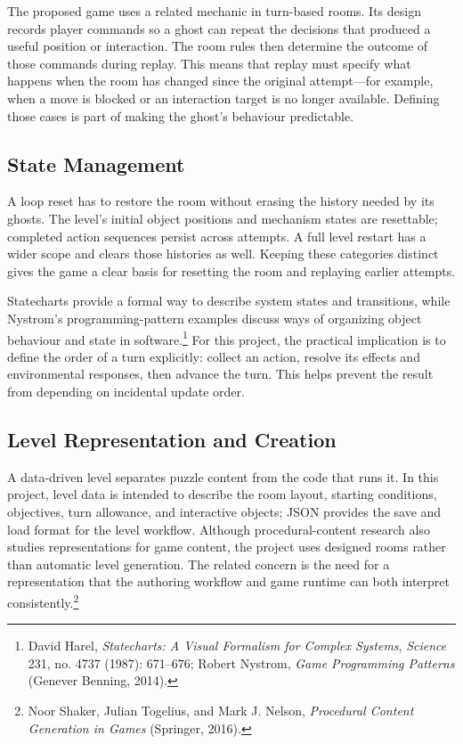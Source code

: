 The proposed game uses a related mechanic in turn-based rooms. Its design records player commands so a ghost can repeat the decisions that produced a useful position or interaction. The room rules then determine the outcome of those commands during replay. This means that replay must specify what happens when the room has changed since the original attempt---for example, when a move is blocked or an interaction target is no longer available. Defining those cases is part of making the ghost's behaviour predictable.

\subsection{State Management}

A loop reset has to restore the room without erasing the history needed by its ghosts. The level's initial object positions and mechanism states are resettable; completed action sequences persist across attempts. A full level restart has a wider scope and clears those histories as well. Keeping these categories distinct gives the game a clear basis for resetting the room and replaying earlier attempts.

Statecharts provide a formal way to describe system states and transitions, while Nystrom's programming-pattern examples discuss ways of organizing object behaviour and state in software.\footnote{David Harel, \textit{Statecharts: A Visual Formalism for Complex Systems}, \textit{Science} 231, no. 4737 (1987): 671--676; Robert Nystrom, \textit{Game Programming Patterns} (Genever Benning, 2014).} For this project, the practical implication is to define the order of a turn explicitly: collect an action, resolve its effects and environmental responses, then advance the turn. This helps prevent the result from depending on incidental update order.

\subsection{Level Representation and Creation}

A data-driven level separates puzzle content from the code that runs it. In this project, level data is intended to describe the room layout, starting conditions, objectives, turn allowance, and interactive objects; JSON provides the save and load format for the level workflow. Although procedural-content research also studies representations for game content, the project uses designed rooms rather than automatic level generation. The related concern is the need for a representation that the authoring workflow and game runtime can both interpret consistently.\footnote{Noor Shaker, Julian Togelius, and Mark J. Nelson, \textit{Procedural Content Generation in Games} (Springer, 2016).}


